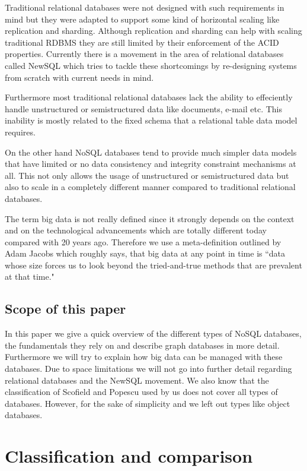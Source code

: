 \documentclass{sig-alternate}
\begin{document}
Traditional relational databases were not designed with such requirements in mind but they were adapted to support some kind of horizontal scaling like replication and sharding. Although replication and sharding can help with scaling traditional RDBMS they are still limited by their enforcement of the ACID properties. Currently there is a movement in the area of relational databases called NewSQL which tries to tackle these shortcomings by re-designing systems from scratch with current needs in mind.

Furthermore most traditional relational databases lack the ability to effeciently handle unstructured or semistructured data like documents, e-mail etc. This inability is mostly related to the fixed schema that a relational table data model requires.

On the other hand NoSQL databases tend to provide much simpler data models that have limited or no data consistency and integrity constraint mechanisms at all. This not only allows the usage of unstructured or semistructured data but also to scale in a completely different manner compared to traditional relational databases\cite{clarence:nosql}.

The term big data is not really defined since it strongly depends on the context and on the technological advancements which are totally different today compared with 20 years ago. Therefore we use a meta-definition outlined by Adam Jacobs which roughly says, that big data at any point in time is ``data whose size forces us to look beyond the tried-and-true methods that are prevalent at that time."\cite{jacobs:bigdata}


\subsection{Scope of this paper}

In this paper we give a quick overview of the different types of NoSQL databases, the fundamentals they rely on and describe graph databases in more detail. Furthermore we will try to explain how big data can be managed with these databases.
Due to space limitations we will not go into further detail regarding relational databases and the NewSQL movement. We also know that the classification of Scofield and Popescu\cite{scofield:classification} used by us does not cover all types of databases. However, for the sake of simplicity and  we left out types like object databases.

\section{Classification and comparison}
\end{document}
